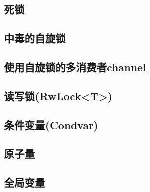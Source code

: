 \subsection{死锁}

\subsection{中毒的自旋锁}

\subsection{使用自旋锁的多消费者channel}

\subsection{读写锁(RwLock<T>)}

\subsection{条件变量(Condvar)}

\subsection{原子量}\label{atomic}

\subsection{全局变量}\label{globalvar}